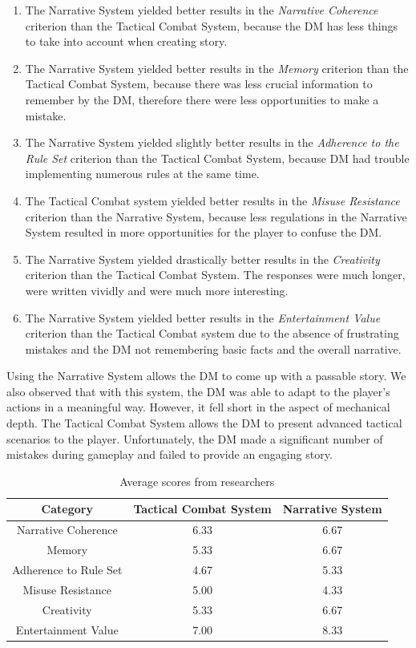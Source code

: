 \documentclass[runningheads]{llncs}
\begin{document}
\begin{enumerate}
\item The Narrative System yielded better results in the \textit{Narrative Coherence} criterion than the Tactical Combat System, because the DM has less things to take into account when creating story.
\item The Narrative System yielded better results in the \textit{Memory} criterion than the Tactical Combat System, because there was less crucial information to remember by the DM, therefore there were less opportunities to make a mistake. 
\item The Narrative System yielded slightly better results in the \textit{Adherence to the Rule Set} criterion than the Tactical Combat System, because DM had trouble implementing numerous rules at the same time. 
\item The Tactical Combat system yielded better results in the \textit{Misuse Resistance} criterion than the Narrative System, because less regulations in the Narrative System resulted in more opportunities for the player to confuse the DM.
\item The Narrative System yielded drastically better results in the \textit{Creativity} criterion than the Tactical Combat System. The responses were much longer, were written vividly and were much more interesting. 
\item The Narrative System yielded better results in the \textit{Entertainment Value} criterion than the Tactical Combat system due to the absence of frustrating mistakes and the DM not remembering basic facts and the overall narrative.
\end{enumerate}
Using the Narrative System allows the DM to come up with a passable story. We also observed that with this system, the DM was able to adapt to the player's actions in a meaningful way. However, it fell short in the aspect of mechanical depth.
The Tactical Combat System allows the DM to present advanced tactical scenarios to the player. Unfortunately, the DM made a significant number of mistakes during gameplay and failed to provide an engaging story.

\begin{table}
    \centering
    \caption{Average scores from researchers}
    \label{tab:research-team-scored}
    \begin{tabular}{|c|c|c|}
        \hline
        Category & Tactical Combat System & Narrative System \\
        \hline
        Narrative Coherence & 6.33 & 6.67 \\
        \hline
        Memory & 5.33 & 6.67 \\
        \hline
        Adherence to Rule Set & 4.67 & 5.33 \\
        \hline
        Misuse Resistance & 5.00 & 4.33\\
        \hline
        Creativity & 5.33 & 6.67 \\
        \hline
        Entertainment Value & 7.00 & 8.33 \\
        \hline
    \end{tabular}
\end{table}
\end{document}
